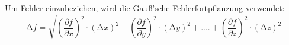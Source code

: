 Um Fehler einzubeziehen, wird die Gauß'sche Fehlerfortpflanzung verwendet:
\begin{equation}
    \label{eqn:9}
    \increment f = \sqrt{\left(\frac{\partial f}{\partial x}\right)^2 \cdot \left(\increment x\right)^2 + \left(\frac{\partial f}{\partial y}\right)^2 \cdot \left(\increment y\right)^2 + .... + \left(\frac{\partial f}{\partial z}\right)^2 \cdot \left(\increment z\right)^2}
\end{equation}